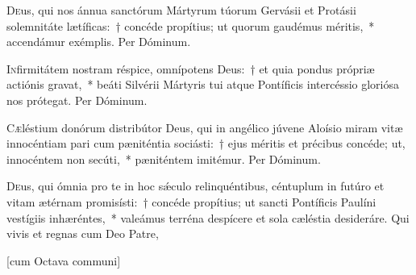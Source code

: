 \documentclass[vesperale_romanum.tex]{subfiles}
\begin{document}
\oratio

\lettrine{D}{e}us, qui nos ánnua san\-ctórum Mártyrum túorum Gervásii et Protásii sole\-mnitáte lætíficas:~† concéde propítius; ut quorum gaudémus méritis,~* accendámur exémplis. Per Dóminum.


\myrule



\oratio

\lettrine{I}{n}firmitátem nostram réspice, omnípotens Deus:~† et quia pondus própriæ actiónis gravat,~* beáti Silvérii Mártyris tui atque Pontíficis intercéssio gloriósa nos prótegat. Per Dóminum.

\myrule

\duplex

\oratio

\lettrine{C}{æ}léstium donórum distribútor Deus, qui in angélico júvene Aloísio miram vitæ innocéntiam pari cum pæniténtia sociásti:~† ejus méritis et précibus concéde; ut, innocéntem non secúti,~* pæniténtem imitémur.
Per Dóminum.


\capitdeseq
\myrule

\newpage
{}
\duplex

\oratio

\lettrine{D}{e}us, qui ómnia pro te in hoc sǽculo relinquéntibus, céntuplum in futúro et vitam ætérnam promisísti:~† concéde propítius; ut san\-cti Pontíficis Paulíni vestígiis inhæréntes,~* valeámus terréna despícere et sola cæléstia desideráre. Qui vivis et regnas cum Deo Patre,

\hicvir

\myrule



\simplex

\vespsequenti
\myrule

\newpage
{}


[cum Octava communi]

\end{document}

